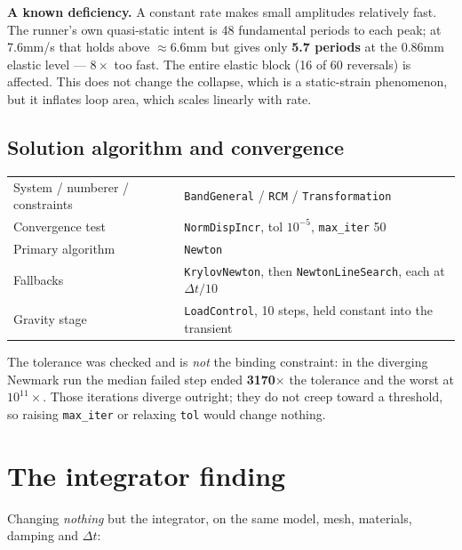 \documentclass[11pt,a4paper]{article}
\begin{document}
\medskip
\textbf{A known deficiency.} A constant rate makes small amplitudes relatively fast. The runner's own
quasi-static intent is 48 fundamental periods to each peak; at 7.6\unit{mm/s} that holds above
$\approx$6.6\unit{mm} but gives only \textbf{5.7 periods} at the 0.86\unit{mm} elastic level ---
$8\times$ too fast. The entire elastic block (16 of 60 reversals) is affected. This does not change
the collapse, which is a static-strain phenomenon, but it inflates loop area, which scales linearly
with rate.

\subsection{Solution algorithm and convergence}

\begin{center}\small
\begin{tabular}{@{}ll@{}}
\toprule
System / numberer / constraints & \texttt{BandGeneral} / \texttt{RCM} / \texttt{Transformation} \\
Convergence test & \texttt{NormDispIncr}, tol $10^{-5}$, \texttt{max\_iter} 50 \\
Primary algorithm & \texttt{Newton} \\
Fallbacks & \texttt{KrylovNewton}, then \texttt{NewtonLineSearch}, each at $\Delta t/10$ \\
Gravity stage & \texttt{LoadControl}, 10 steps, held constant into the transient \\
\bottomrule
\end{tabular}
\end{center}

The tolerance was checked and is \emph{not} the binding constraint: in the diverging Newmark run the
median failed step ended \textbf{3170$\times$} the tolerance and the worst at $10^{11}\times$. Those
iterations diverge outright; they do not creep toward a threshold, so raising \texttt{max\_iter} or
relaxing \texttt{tol} would change nothing.

\section{The integrator finding}\label{sec:integ}

Changing \emph{nothing} but the integrator, on the same model, mesh, materials, damping and
$\Delta t$:
\end{document}
